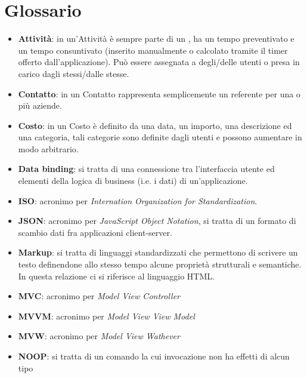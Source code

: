 \section{Glossario}

\begin{itemize}
\item \textbf{Attività}: in \fiscolo{} un'Attività è sempre parte di un ,
ha un tempo preventivato e un tempo consuntivato (inserito manualmente o calcolato tramite
il timer offerto dall'applicazione). Può essere assegnata a degli/delle utenti o presa
in carico dagli stessi/dalle stesse.

\item \textbf{Contatto}: in \fiscolo{} un Contatto rappresenta semplicemente un referente
per una o più aziende.

\item \textbf{Costo}: in \fiscolo{} un Costo è definito da una data, un importo, una
descrizione ed una categoria, tali categorie sono definite dagli utenti e possono aumentare
in modo arbitrario.

\item \textbf{Data binding}: si tratta di una connessione tra l'interfaccia utente ed
elementi della logica di business (i.e. i dati) di un'applicazione.

\item \textbf{ISO}: acronimo per \textit{Internation Organization for Standardization}.

\item \textbf{JSON}: acronimo per \textit{JavaScript Object Notation}, si tratta di un formato
di scambio dati fra applicazioni client-server.

\item \textbf{Markup}: si tratta di linguaggi standardizzati che permettono di scrivere un
testo definendone allo stesso tempo alcune proprietà strutturali e semantiche. In questa
relazione ci si riferisce al linguaggio HTML.

\item \textbf{MVC}: acronimo per \textit{Model View Controller}

\item \textbf{MVVM}: acronimo per \textit{Model View View Model}

\item \textbf{MVW}: acronimo per \textit{Model View Wathever}

\item \textbf{NOOP}: si tratta di un comando la cui invocazione non ha effetti di alcun
tipo


\end{itemize}
